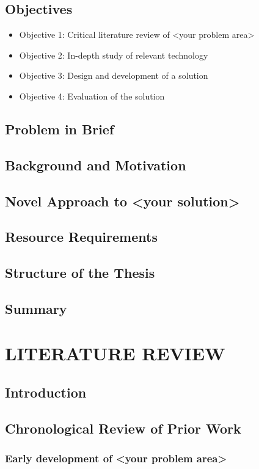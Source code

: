 \documentclass[12pt, a4paper]{report}
\begin{document}
\section{Objectives}
\begin{itemize}
    \item Objective 1: Critical literature review of <your problem area>
    \item Objective 2: In-depth study of relevant technology
    \item Objective 3: Design and development of a solution
    \item Objective 4: Evaluation of the solution
\end{itemize}
\section{Problem in Brief}
\section{Background and Motivation}
\section{Novel Approach to <your solution>}
\section{Resource Requirements}
\section{Structure of the Thesis}
\section{Summary}

\chapter{LITERATURE REVIEW}
\section{Introduction}
\section{Chronological Review of Prior Work}
\subsection{Early development of <your problem area>}
\end{document}
